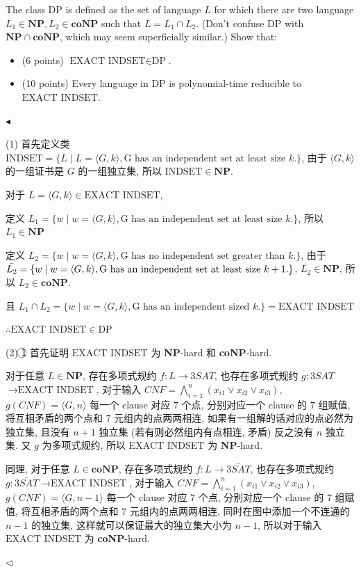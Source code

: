 \documentclass[11pt]{article}
\newcommand{\NP}{\mathbf{NP}}
\newcommand{\coNP}{\mathbf{coNP}}
\newenvironment{problem}[2][Problem]{\begin{trivlist}
		\item[\hskip \labelsep {\bfseries #1}\hskip \labelsep {\bfseries #2.}]}{\hfill$\blacktriangleleft$\end{trivlist}}
\newenvironment{answer}[1][Answer]{\begin{trivlist}
		\item[\hskip \labelsep {\bfseries #1.}\hskip \labelsep]}{\hfill$\lhd$\end{trivlist}}
\begin{document}
	\begin{problem}{4.(16 points)}
		The class DP is defined as the set of language $L$ for which there are two language $L_1 \in \NP, L_2 \in \coNP$  such that $L = L_1 \cap L_2$. (Don't confuse DP with $\NP\cap \coNP$, which may seem superficially similar.) Show that:
		\begin{itemize}
			\item (6 points) $\text{EXACT INDSET} \in \text{DP}$.
			\item (10 points) Every language in $\text{DP}$ is polynomial-time reducible to $\text{EXACT INDSET}$.
		\end{itemize}
	\end{problem}
	\begin{answer}
		(1) 首先定义类 $\text{INDSET}=\{L\mid L=\langle G,k\rangle,\text{G has an independent set at least size }k.\}$, 由于 $\langle G,k\rangle$ 的一组证书是 $G$ 的一组独立集, 所以 $\text{INDSET}\in\NP$.
		
		对于 $L=\langle G,k\rangle\in\text{EXACT INDSET}$, 
		
		定义 $L_1=\{w\mid w=\langle G,k\rangle,\text{G has an independent set at least size }k.\}$, 所以 $L_1\in\NP$
		
		定义 $L_2=\{w\mid w=\langle G,k\rangle,\text{G has no independent set greater than }k.\}$, 由于 $\bar{L_2}=\{w\mid w=\langle G,k\rangle,\\\text{G has an independent set at least size }k+1.\}$, $\bar{L_2}\in\NP$, 所以 $L_2\in\coNP$.
		
		且 $L_1\cap L_2=\{w\mid w=\langle G,k\rangle,\text{G has an independent sized }k.\}=\text{EXACT INDSET}$
		
		$\therefore \text{EXACT INDSET}\in\text{DP}$
		
		(2) \textcircled{1} 首先证明 $\text{EXACT INDSET}$ 为 \textbf{NP}-hard 和 \textbf{coNP}-hard.
		
		对于任意 $L\in\NP$, 存在多项式规约 $f:L\rightarrow 3SAT$, 也存在多项式规约 $g:3SAT$$\rightarrow\text{EXACT INDSET}$, 对于输入 $CNF=\bigwedge\limits_{i=1}^{n}(x_{i1}\vee x_{i2}\vee x_{i3})$, $g(CNF)=\langle G,n\rangle$ 每一个 clause 对应 $7$ 个点, 分别对应一个 clause 的 $7$ 组赋值, 将互相矛盾的两个点和 $7$ 元组内的点两两相连, 如果有一组解的话对应的点必然为独立集, 且没有 $n+1$ 独立集 (若有则必然组内有点相连, 矛盾) 反之没有 $n$ 独立集. 又 $g$ 为多项式规约, 所以 EXACT INDSET 为 \textbf{NP}-hard.
		
		同理, 对于任意 $L\in\coNP$, 存在多项式规约 $f:L\rightarrow \bar{3SAT}$, 也存在多项式规约 $g:\bar{3SAT}$$\rightarrow\text{EXACT INDSET}$, 对于输入 $CNF=\bigwedge\limits_{i=1}^{n}(x_{i1}\vee x_{i2}\vee x_{i3})$, $g(CNF)=\langle G,n-1\rangle$ 每一个 clause 对应 $7$ 个点, 分别对应一个 clause 的 $7$ 组赋值, 将互相矛盾的两个点和 $7$ 元组内的点两两相连, 同时在图中添加一个不连通的 $n-1$ 的独立集, 这样就可以保证最大的独立集大小为 $n-1$, 所以对于输入 $\text{EXACT INDSET}$ 为 \textbf{coNP}-hard.
		

\end{answer}
\end{document}
